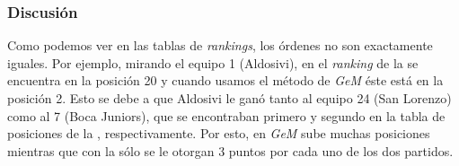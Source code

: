 			\subsubsection*{Discusión}


			Como podemos ver en las tablas de \emph{rankings}, los órdenes no son exactamente iguales. Por ejemplo, mirando el equipo 1 (Aldosivi), en el \emph{ranking} de la  se encuentra en la posición 20 y cuando usamos el método de \emph{GeM} éste está en la posición 2. Esto se debe a que Aldosivi le ganó tanto al equipo 24 (San Lorenzo) como al 7 (Boca Juniors), que se encontraban primero y segundo en la tabla de posiciones de la , respectivamente. Por esto, en \emph{GeM} sube muchas posiciones mientras que con la  sólo se le otorgan 3 puntos por cada uno de los dos partidos.

